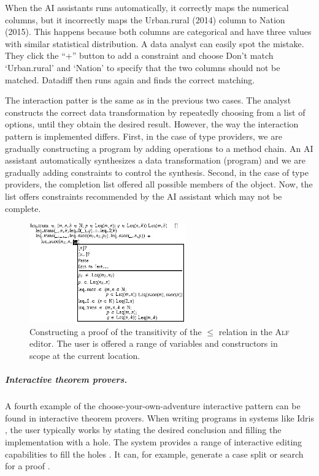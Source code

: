 \documentclass[ a4paper,UKenglish,cleveref, autoref, thm-restate]{lipics-v2021}
\newcommand{\ident}[1]{\textsf{#1}}
\begin{document}
When the AI assistants runs automatically, it correctly maps the numerical columns, but it
incorrectly maps the \ident{Urban.rural} (2014) column to \ident{Nation} (2015). This happens
because both columns are categorical and have three values with similar statistical distribution. A data
analyst can easily spot the mistake. They click the ``+'' button to add a constraint and choose
\ident{Don't match `Urban.rural' and `Nation'} to specify that the two columns should not be matched.
Datadiff then runs again and finds the correct matching.

The interaction patter is the same as in the previous two cases. The analyst constructs the
correct data transformation by repeatedly choosing from a list of options, until they obtain
the desired result. However, the way the interaction pattern is implemented differs.
First, in the case of type providers, we are gradually constructing a program by adding operations to
a method chain. An AI assistant automatically synthesizes a data transformation (program) and we are
gradually adding constraints to control the synthesis. Second, in the case of type providers,
the completion list offered all possible members of the object. Now, the list offers
constraints recommended by the AI assistant which may not be complete.

\begin{figure}[t]
  \vspace{-0.5em}
  \includegraphics[width=0.6\textwidth]{fig/alf.png}
  \caption{Constructing a proof of the transitivity of the $\leq$ relation in the \textsc{Alf}
    editor. The user is offered a range of variables and constructors in scope at the current
    location. \cite{altenkirch-1994-alf}}
  \label{fig:alf}
\end{figure}


\subparagraph{Interactive theorem provers.}
A fourth example of the choose-your-own-adventure interactive pattern can be found in interactive
theorem provers. When writing programs in systems like Idris \cite{brady-2021-idris2}, the
user typically works by stating the desired conclusion and filling the implementation with a hole.
The system provides a range of interactive editing capabilities to fill the holes \cite{mcbride-1999-dependently}.
It can, for example, generate a case split or search for a proof \cite{brady-2015-idris}.
\end{document}
